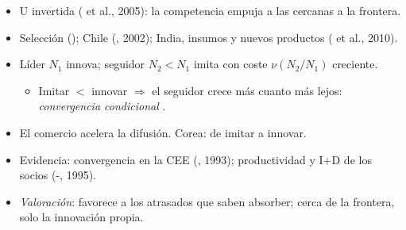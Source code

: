 \documentclass{article}
\begin{document}
\begin{columnas}
\begin{itemize}
\begin{itemize}
  \end{itemize}
\item U invertida ( et al., 2005): la competencia empuja a las cercanas a la frontera.
\item Selección (); Chile (, 2002); India, insumos y nuevos productos ( et al., 2010).
\end{itemize}
\begin{itemize}
\item Líder $N_1$ innova; seguidor $N_2<N_1$ imita con coste $\nu(N_2/N_1)$ creciente.
  \begin{itemize}
  \item Imitar $<$ innovar $\Rightarrow$ el seguidor crece más cuanto más lejos: \emph{convergencia condicional} .
  \end{itemize}
\item El comercio acelera la difusión. Corea: de imitar a innovar.
\item Evidencia: convergencia en la CEE (, 1993); productividad y I+D de los socios (-, 1995).
\item \emph{Valoración}: favorece a los atrasados que saben absorber; cerca de la frontera, solo la innovación propia.
\end{itemize}


\end{columnas}
\end{document}
